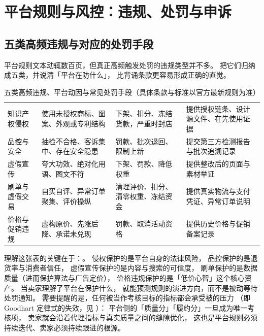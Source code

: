 \section{平台规则与风控：违规、处罚与申诉}
\label{sec:plat-risk}

\subsection{五类高频违规与对应的处罚手段}

平台规则文本动辄数百页，但真正高频触发处罚的违规类型并不多。
把它们归纳成五类，并说清「平台在防什么」，
比背诵条款更容易形成正确的直觉。

\begin{table}[htbp]
\centering
\caption{五类高频违规、平台动因与常见处罚手段（具体条款与标准以官方最新规则为准）}
\label{tab:plat-penalty}
\small
\begin{tabularx}{\textwidth}{L{2.0cm} L{3.2cm} L{3.1cm} Y}
\toprule
{} &  &  &  \\
\midrule
知识产权侵权 & 使用未授权商标、图案、外观或专利结构 & 下架、扣分、冻结货款，严重时封店 & 提供授权链条、设计源文件、在先使用证据 \\
\addlinespace
品控与安全 & 抽检不合格、客诉集中、存在安全隐患 & 罚款、批次退回、限制上新 & 提交第三方检测报告与批次追溯记录 \\
\addlinespace
虚假宣传 & 夸大功效、绝对化用语、图文不符 & 下架、罚款、降低权重 & 提供整改后的页面与素材举证 \\
\addlinespace
刷单与虚假交易 & 自买自评、异常订单聚集、评价操纵 & 清理评价、扣分、清零权重、冻结资金 & 提供真实物流与支付凭证、异常订单说明 \\
\addlinespace
价格与促销违规 & 虚构原价、先涨后降、承诺未兑现 & 罚款、取消活动资格 & 提供历史价格与促销备案记录 \\
\bottomrule
\end{tabularx}
\end{table}

理解这张表的关键在于：。
侵权保护的是平台自身的法律风险，
品控保护的是退货率与消费者信任，
虚假宣传保护的是内容与搜索的可信度，
刷单保护的是数据质量（进而保护算法与广告定价），
价格违规保护的是「低价心智」这个核心资产。
当卖家理解了平台在保护什么，
就能预测规则的演进方向，而不是被动等待处罚通知。
需要提醒的是，任何被当作考核目标的指标都会承受被的压力
（即 Goodhart 定律式的失效，见 \cite{goodhart1975}）：
平台侧的「质量分」「履约分」一旦成为唯一考核项，
卖家就会沿着代理指标与真实质量之间的缝隙优化，
这也是平台规则必须持续迭代、卖家必须持续跟进的根源。

